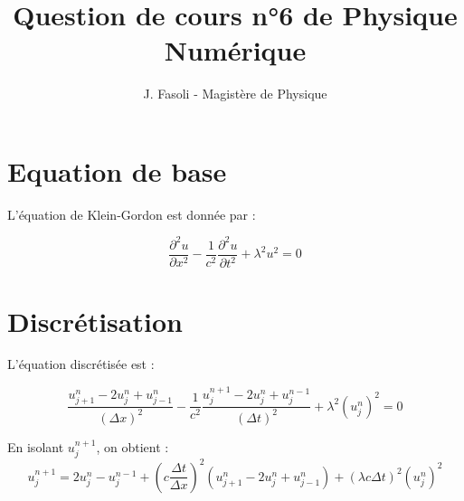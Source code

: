 \documentclass{article}
\begin{document}
\title{Question de cours n°6 de Physique Numérique}
\author{J. Fasoli - Magistère de Physique}

\maketitle

\section{Equation de base}

L'équation de Klein-Gordon est donnée par :

$$
\frac{\partial^2 u}{\partial x^2} - \frac{1}{c^2} \frac{\partial^2 u}{\partial t^2} + \lambda^2 u^2 = 0
$$

\section{Discrétisation}

L'équation discrétisée est :

$$
\frac{u_{j+1}^{n} - 2u_{j}^{n} + u_{j-1}^{n}}{(\Delta x)^2} - \frac{1}{c^2}  \frac{u_{j}^{n+1} - 2u_{j}^{n} + u_{j}^{n-1}}{(\Delta t)^2} + \lambda^2 (u_{j}^{n})^2 = 0
$$


En isolant $u_{j}^{n+1}$, on obtient :
$$
u_{j}^{n+1} = 2u_{j}^{n} - u_{j}^{n-1} + (c\frac{\Delta t}{\Delta x})^2 (u_{j+1}^{n} - 2u_{j}^{n} + u_{j-1}^{n}) + (\lambda c \Delta t)^2 (u_{j}^{n})^2
$$
\end{document}
